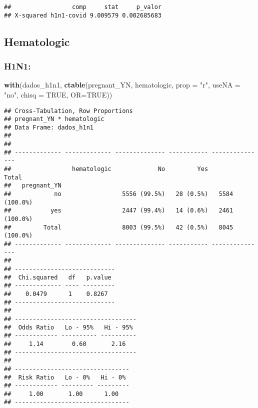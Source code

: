 \documentclass[
]{article}
\newenvironment{Shaded}{\begin{snugshade}}{\end{snugshade}}
\newcommand{\DataTypeTok}[1]{\textcolor[rgb]{0.13,0.29,0.53}{#1}}
\newcommand{\KeywordTok}[1]{\textcolor[rgb]{0.13,0.29,0.53}{\textbf{#1}}}
\newcommand{\NormalTok}[1]{#1}
\newcommand{\OtherTok}[1]{\textcolor[rgb]{0.56,0.35,0.01}{#1}}
\newcommand{\StringTok}[1]{\textcolor[rgb]{0.31,0.60,0.02}{#1}}
\begin{document}
\begin{verbatim}
##                 comp     stat     p_valor
## X-squared h1n1-covid 9.009579 0.002685683
\end{verbatim}

\hypertarget{hematologic}{%
\subsection{Hematologic}\label{hematologic}}

\hypertarget{h1n1-9}{%
\subsubsection{H1N1:}\label{h1n1-9}}

\begin{Shaded}
\begin{Highlighting}[]
\KeywordTok{with}\NormalTok{(dados_h1n1, }\KeywordTok{ctable}\NormalTok{(pregnant_YN, hematologic, }\DataTypeTok{prop =} \StringTok{"r"}\NormalTok{, }\DataTypeTok{useNA =} \StringTok{"no"}\NormalTok{, }\DataTypeTok{chisq =} \OtherTok{TRUE}\NormalTok{, }\DataTypeTok{OR=}\OtherTok{TRUE}\NormalTok{))}
\end{Highlighting}
\end{Shaded}

\begin{verbatim}
## Cross-Tabulation, Row Proportions  
## pregnant_YN * hematologic  
## Data Frame: dados_h1n1  
## 
## 
## ------------- ------------- -------------- ----------- ---------------
##                 hematologic             No         Yes           Total
##   pregnant_YN                                                         
##            no                 5556 (99.5%)   28 (0.5%)   5584 (100.0%)
##           yes                 2447 (99.4%)   14 (0.6%)   2461 (100.0%)
##         Total                 8003 (99.5%)   42 (0.5%)   8045 (100.0%)
## ------------- ------------- -------------- ----------- ---------------
## 
## ----------------------------
##  Chi.squared   df   p.value 
## ------------- ---- ---------
##    0.0479      1    0.8267  
## ----------------------------
## 
## ----------------------------------
##  Odds Ratio   Lo - 95%   Hi - 95% 
## ------------ ---------- ----------
##     1.14        0.60       2.16   
## ----------------------------------
## 
## --------------------------------
##  Risk Ratio   Lo - 0%   Hi - 0% 
## ------------ --------- ---------
##     1.00       1.00      1.00   
## --------------------------------
\end{verbatim}
\end{document}
